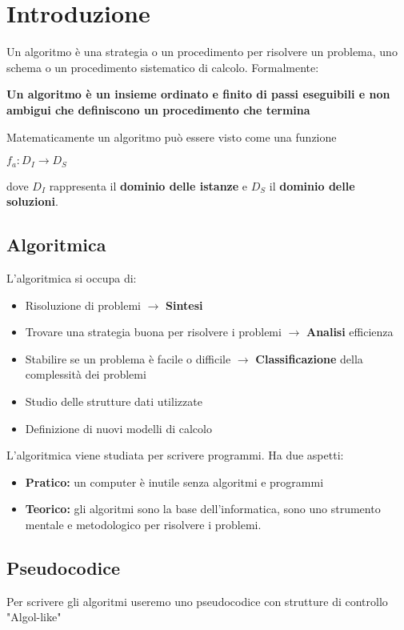 \section{Introduzione}
Un algoritmo è una strategia o un procedimento per risolvere un problema,
uno schema o un procedimento sistematico di calcolo. Formalmente:
\begin{center} 
    {\textbf{Un algoritmo è un insieme ordinato e finito di passi eseguibili e 
    non ambigui che definiscono un procedimento che termina}}
\end{center}
Matematicamente un algoritmo può essere visto come una funzione
\begin{center}
    $f_a:D_I \to D_S $
\end{center}
dove $D_I$ rappresenta il {\textbf{dominio delle istanze}} e $D_S$ il {\textbf{dominio delle soluzioni}}. \\


\subsection{Algoritmica}

L'algoritmica si occupa di:
\begin{itemize}
    \item Risoluzione di problemi $\rightarrow$ \textbf{Sintesi}
    \item Trovare una strategia buona per risolvere i problemi $\rightarrow$ \textbf{Analisi} efficienza
    \item Stabilire se un problema è facile o difficile $\rightarrow$ \textbf{Classificazione} della complessità dei problemi
    \item Studio delle strutture dati utilizzate
    \item Definizione di nuovi modelli di calcolo
\end{itemize}


\noindent L'algoritmica viene studiata per scrivere programmi. Ha due aspetti:
\begin{itemize}
    \item \textbf{Pratico:} un computer è inutile senza algoritmi e programmi
    \item \textbf{Teorico:} gli algoritmi sono la base dell'informatica, sono uno strumento 
    mentale e metodologico per risolvere i problemi.
\end{itemize}

\subsection{Pseudocodice}
Per scrivere gli algoritmi useremo uno pseudocodice con strutture di controllo "Algol-like"

